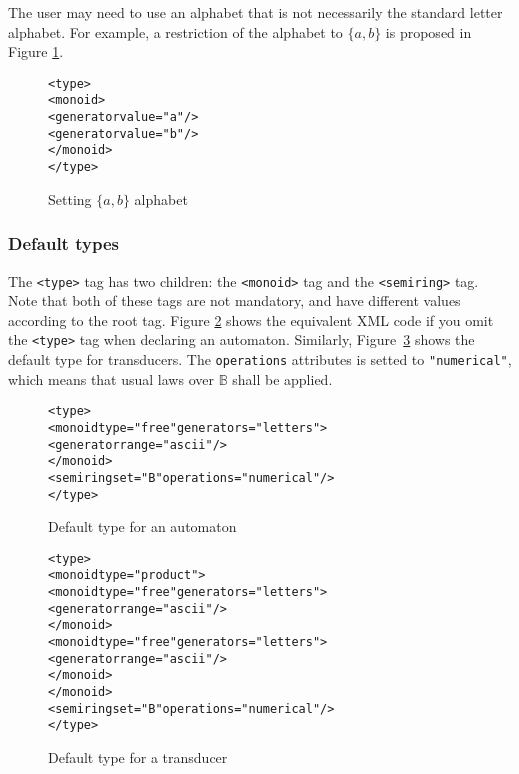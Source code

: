 \documentclass[a4paper]{llncs}
\begin{document}
The user may need to use an alphabet that is not necessarily the
standard letter alphabet. For example, a restriction of the alphabet
to $\{a, b\}$ is proposed in Figure \ref{alpha1}.


{\small

\begin{figure}[h]
  \begin{center}
\begin{alltt}
<type>
  <monoid>
     <generator value="a"/>
     <generator value="b"/>
  </monoid>
</type>
\end{alltt}

\caption{Setting $\{a, b\}$ alphabet}
\label{alpha1}
  \end{center}
\end{figure}

}


\subsubsection{Default types}

The \verb|<type>| tag has two children: the \verb|<monoid>| tag and
the \verb|<semiring>| tag. Note that both of these tags are not
mandatory, and have different values according to the root tag. Figure
\ref{automatontype} shows the equivalent XML code if you omit the
\verb|<type>| tag when declaring an automaton. Similarly,
Figure~\ref{transducertype} shows the default type for transducers.
The \verb|operations| attributes is setted to \verb|"numerical"|,
which means that usual laws over $\mathbb{B}$ shall be applied.

\begin{figure}[h]
  \begin{center}
\begin{alltt}
<type>
  <monoid type="free" generators="letters">
     <generator range="ascii"/>
  </monoid>
  <semiring set="B" operations="numerical"/>
</type>
\end{alltt}

\caption{Default type for an automaton}
\label{automatontype}
  \end{center}
\end{figure}


\begin{figure}[h]
  \begin{center}
\begin{alltt}
<type>
  <monoid type="product">
     <monoid type="free" generators="letters">
       <generator range="ascii"/>
     </monoid>
     <monoid type="free" generators="letters">
       <generator range="ascii"/>
     </monoid>
  </monoid>
  <semiring set="B" operations="numerical"/>
</type>
\end{alltt}

\caption{Default type for a transducer}
\label{transducertype}
  \end{center}
\end{figure}
\end{document}
